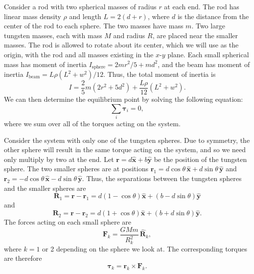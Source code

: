 \documentclass[aps, reprint,amsmath,amssymb]{revtex4-1} %
\renewcommand{\vec}[1]{\boldsymbol{#1}}
\newcommand{\uv}[1]{\vec{\hat{#1}}}
\newcommand{\x}{\vec{\hat{x}}}
\newcommand{\y}{\vec{\hat{y}}}
\begin{document}
Consider a rod with two spherical masses of radius $r$ at each end.  The
rod has linear mass density $\rho$ and length $L=2(d + r)$, where $d$ is
the distance from the center of the rod to each sphere. The two masses have
mass $m$. Two large tungsten masses, each with mass $M$ and radius $R$, are
placed near the smaller masses. The rod is allowed to rotate about its
center, which we will use as the origin, with the rod and all masses
existing in the $x$-$y$ plane. Each small spherical mass has moment of
inertia $I_\text{sphere} = 2mr^2/5 + md^2$, and the beam has moment of
inertia $I_\text{beam} = L\rho(L^2 + w^2)/12$. Thus, the total moment
of inertia is
\begin{equation}
    \label{eq:moment_of_inertia}
    I = \frac{2}{5} m (2 r^2 + 5 d^2) + \frac{L\rho}{12}(L^2 + w^2).
\end{equation}
We can then determine the equilibrium point by solving the following
equation:
\begin{equation}
    \sum_i \vec{\tau}_i = 0,
\end{equation}
where we sum over all of the torques acting on the system. 

Consider the system with only one of the tungsten spheres. Due to symmetry,
the other sphere will result in the same torque acting on the system, and
so we need only multiply by two at the end. Let $\vec{r} = d\x + b\y$ be the
position of the tungsten sphere. The two smaller spheres are at positions
$\vec{r}_1 = d \cos\theta\,\x + d \sin \theta \, \y$ and $\vec{r}_2 = -d
\cos \theta\,\x - d \sin \theta \, \y$. Thus, the separations between the
tungsten spheres and the smaller spheres are
\[
    \vec{R}_1 = \vec{r} - \vec{r}_1 = d(1 - \cos\theta)\x + (b -
    d\sin\theta) \y
\]
and
\[
    \vec{R}_2 = \vec{r} - \vec{r}_2 = d(1 + \cos\theta)\x + (b + d \sin
    \theta) \y.
\]
The forces acting on each small sphere are
\begin{equation}
    \label{eq:forces}
    \vec{F}_k = \frac{G M m}{R_k^2}\,\uv{R}_k,
\end{equation}
where $k = 1$ or 2 depending on the sphere we look at. The corresponding
torques are therefore
\begin{equation}
    \label{eq:torques}
    \vec{\tau}_k = \vec{r}_k \times \vec{F}_k.
\end{equation}
\end{document}
